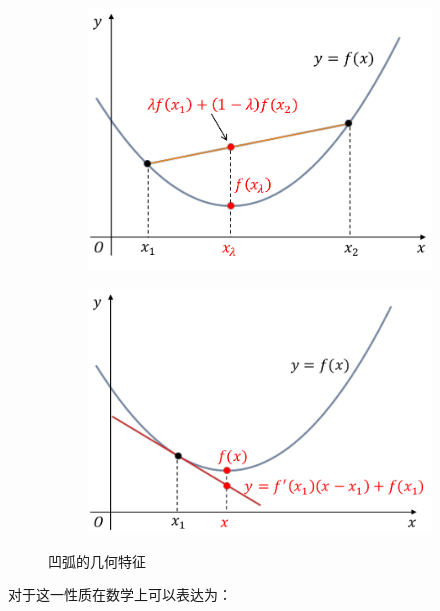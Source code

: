 \begin{figure}[h]
	\centering
	\begin{subfigure}[t]{0.45\textwidth}
		\centering
		\includegraphics[width=\textwidth]
		{./Images/Ch03/convexCurve-1.pdf}
	\end{subfigure}
	\begin{subfigure}[t]{0.45\textwidth}
		\centering
		\includegraphics[width=\textwidth]
		{./Images/Ch03/convexCurve-2.pdf}
	\end{subfigure}
	\caption{凹弧的几何特征}
	\label{fig:convexCurve}
\end{figure}

对于这一性质在数学上可以表达为：

